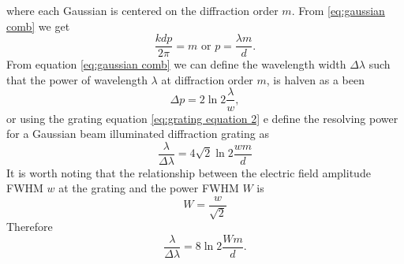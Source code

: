 \documentclass[12pt,twoside,english]{book}
\renewcommand{\~}{\perispomeni}%
\numberwithin{equation}{section}
\numberwithin{figure}{section}
\begin{document}
where each Gaussian is centered on the diffraction order $m$. From \ref{eq:gaussian comb} we get
\begin{equation}
\frac{kdp}{2\pi}=m\mbox{ or }p=\frac{\lambda m}{d}.\label{eq:grating equation 2}
\end{equation}
From equation \ref{eq:gaussian comb} we can define the wavelength width $\Delta\lambda$ such that the power of wavelength $\lambda$ at diffraction order $m$, is halven as a been
\begin{equation}
\Delta p=2\ln2\frac{\lambda}{w},
\end{equation}
or using the grating equation \ref{eq:grating equation 2} e define the resolving power for a Gaussian beam illuminated diffraction grating as
\begin{equation}
\frac{\lambda}{\Delta\lambda}=4\sqrt{2}\ln2\frac{wm}{d}\label{eq:resolving power gaussian}\end{equation}
It is worth noting that the relationship between the electric field amplitude \gls{FWHM} $w$ at the grating and the power \gls{FWHM} $W$ is
\begin{equation}
W=\frac{w}{\sqrt{2}}
\end{equation}
Therefore
\begin{equation}
\frac{\lambda}{\Delta\lambda}=8\ln2\frac{Wm}{d}.
\end{equation}
%
\end{document}

